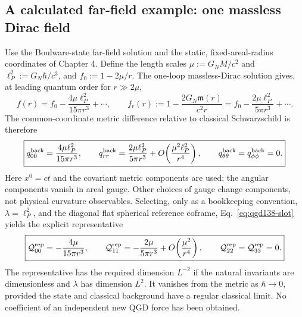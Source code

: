 \documentclass[11pt,a4paper]{article}
\begin{document}
\subsection{A calculated far-field example: one massless Dirac field}
Use the Boulware-state far-field solution and the static, fixed-areal-radius
coordinates of Chapter 4. Define the length scales
$\mu:=G_NM/c^2$ and $\ell_P^2:=G_N\hbar/c^3$, and
$f_0:=1-2\mu/r$. The one-loop massless-Dirac solution gives, at
leading quantum order for $r\gg2\mu$,
\begin{equation}\label{eq:qgd138-correctedf}
 f(r)=f_0-\frac{4\mu\ell_P^2}{15\pi r^3}+\cdots,
 \qquad
 f_r(r):=1-\frac{2G_N\mathfrak m(r)}{c^2r}
 =f_0-\frac{2\mu\ell_P^2}{5\pi r^3}+\cdots .
\end{equation}
The common-coordinate metric difference relative to classical
Schwarzschild is therefore
\begin{equation}\label{eq:qgd138-qcomponents}
 \boxed{q^{\rm back}_{00}=\frac{4\mu\ell_P^2}{15\pi r^3},
 \qquad q^{\rm back}_{rr}=\frac{2\mu\ell_P^2}{5\pi r^3}
 +O\!\left(\frac{\mu^2\ell_P^2}{r^4}\right),\qquad
 q^{\rm back}_{\theta\theta}=q^{\rm back}_{\phi\phi}=0.}
\end{equation}
Here $x^0=ct$ and the covariant metric components are used; the
angular components vanish in areal gauge. Other choices of gauge change
components, not physical curvature observables.
Selecting, only as a bookkeeping convention, $\lambda=\ell_P^2$,
and the diagonal flat spherical reference coframe,
Eq.~\eqref{eq:qgd138-slot} yields the explicit representative
\begin{equation}\label{eq:qgd138-Qexample}
 \boxed{\mathcal Q_{00}^{\rm rep}=-\frac{4\mu}{15\pi r^3},
 \qquad \mathcal Q_{11}^{\rm rep}=-\frac{2\mu}{5\pi r^3}
 +O\!\left(\frac{\mu^2}{r^4}\right),\qquad
 \mathcal Q_{22}^{\rm rep}=\mathcal Q_{33}^{\rm rep}=0.}
\end{equation}
The representative has the required dimension $L^{-2}$ if the
natural invariants are dimensionless and $\lambda$ has dimension $L^2$.
It vanishes from the metric as $\hbar\to0$, provided the state and
classical background have a regular classical limit. No coefficient
of an independent new QGD force has been obtained.
\end{document}
